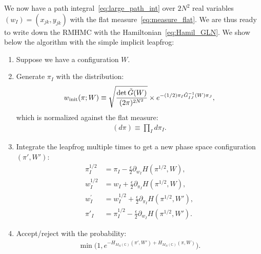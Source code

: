\documentclass[12pt]{article}
\begin{document}
We now have
a path integral~\eqref{eq:large_path_int}
over $2N^2$ real variables
$(w_I) = (x_{jk}, y_{jk})$
with the flat measure~\eqref{eq:measure_flat}.
We are thus ready to write down the
RMHMC with the Hamiltonian~\eqref{eq:Hamil_GLN}.
We show below the algorithm with the simple implicit leapfrog:
\begin{enumerate}
\item Suppose we have a configuration $W$.
\item Generate $\pi_I$
  with the distribution:
  \begin{align}
    w_{\rm init}(\pi; W)
    \equiv
    \sqrt{ \frac{ {\rm det}\, \tilde G(W) }{(2\pi)^{2N^2}} }
    \times
    e^{-(1/2) \pi_I \tilde G_{IJ}^{-1}(W) \pi_J},
  \end{align}
  which is normalized against the flat measure:
\begin{align}
  (d\pi) \equiv \prod_I d\pi_I.
\end{align}
\item
  Integrate the leapfrog
  multiple times to get a new phase space configuration $(\pi',W')$:
  \begin{align}
    \pi_I^{1/2}
    &=
      \pi_I
      -
      \frac{\epsilon}{2}
      \partial_{w_I} H(\pi^{1/2}, W)
      ,
      \label{eq:p_half}
    \\
    w_I^{1/2}
    &=
      w_I
      +
      \frac{\epsilon}{2}
      \partial_{\pi_I} H(\pi^{1/2}, W)
      ,
      \label{eq:q_half}
    \\
    w_I^{\prime}
    &=
      w_I^{1/2}
      +
      \frac{\epsilon}{2}
      \partial_{\pi_I} H(\pi^{1/2}, W')
      ,
      \label{eq:q_prime}
    \\
    \pi'_I
    &= \pi_I^{1/2}
      -
      \frac{\epsilon}{2}
      \partial_{w_I} H(\pi^{1/2}, W').
      \label{eq:p_prime}
  \end{align}
\item Accept/reject with the probability:
  \begin{align}
    \min \Big(
    1, e^{-H_{M_N(\mathbb{C})}(\pi',W') + H_{M_N(\mathbb{C})}(\pi, W)}
    \Big).
  \end{align}
\end{enumerate}
\end{document}
